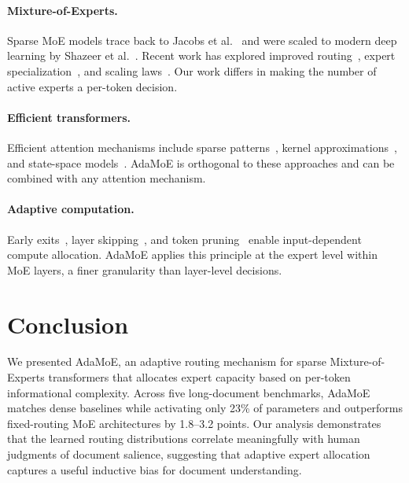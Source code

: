 \documentclass[11pt,a4paper]{article}
\begin{document}
\paragraph{Mixture-of-Experts.}
Sparse MoE models trace back to Jacobs et al.~\cite{jacobs1991adaptive} and were
scaled to modern deep learning by Shazeer et al.~\cite{shazeer2017outrageously}.
Recent work has explored improved routing~\cite{lewis2021base,zhou2022mixture},
expert specialization~\cite{dai2022stablemoe}, and scaling
laws~\cite{clark2022unified}.
Our work differs in making the number of active experts a per-token decision.

\paragraph{Efficient transformers.}
Efficient attention mechanisms include sparse patterns~\cite{child2019sparsetransformer,
beltagy2020longformer,zaheer2020bigbird}, kernel approximations~\cite{katharopoulos2020transformers,
choromanski2021rethinking}, and state-space models~\cite{gu2022efficiently}.
AdaMoE is orthogonal to these approaches and can be combined with any attention mechanism.

\paragraph{Adaptive computation.}
Early exits~\cite{schwartz2020right,xin2020deebert}, layer
skipping~\cite{fan2020reducing}, and token pruning~\cite{goyal2020power,kim2022learned}
enable input-dependent compute allocation.
AdaMoE applies this principle at the expert level within MoE layers, a finer granularity
than layer-level decisions.

\section{Conclusion}
\label{sec:conclusion}

We presented AdaMoE, an adaptive routing mechanism for sparse Mixture-of-Experts
transformers that allocates expert capacity based on per-token informational complexity.
Across five long-document benchmarks, AdaMoE matches dense baselines while activating only
23\% of parameters and outperforms fixed-routing MoE architectures by 1.8--3.2 points.
Our analysis demonstrates that the learned routing distributions correlate meaningfully
with human judgments of document salience, suggesting that adaptive expert allocation
captures a useful inductive bias for document understanding.
\end{document}
